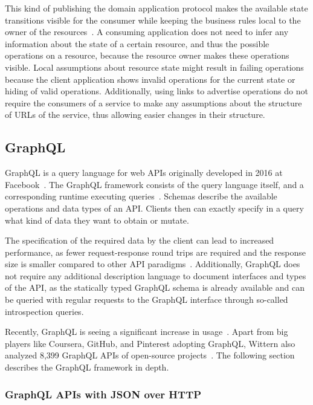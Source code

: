 This kind of publishing the domain application protocol makes the available state transitions visible for the consumer while keeping the business rules local to the owner of the resources~\cite{Webber2010}.
A consuming application does not need to infer any information about the state of a certain resource, and thus the possible operations on a resource, because the resource owner makes these operations visible.
Local assumptions about resource state might result in failing operations because the client application shows invalid operations for the current state or hiding of valid operations.
Additionally, using links to advertise operations do not require the consumers of a service to make any assumptions about the structure of \acp{URL} of the service, thus allowing easier changes in their structure.

\subsection{GraphQL}\label{sec:graphql}

GraphQL is a query language for web \acp{API} originally developed in 2016 at Facebook~\cite{Hartig2017}.
The GraphQL framework consists of the query language itself, and a corresponding runtime executing queries~\cite{Wittern2019}.
Schemas describe the available operations and data types of an \ac{API}.
Clients then can exactly specify in a query what kind of data they want to obtain or mutate.

The specification of the required data by the client can lead to increased performance, as fewer request-response round trips are required and the response size is smaller compared to other \ac{API} paradigms~\cite{Wittern2019}.
Additionally, GraphQL does not require any additional description language to document interfaces and types of the \ac{API}, as the statically typed GraphQL schema is already available and can be queried with regular requests to the GraphQL interface through so-called introspection queries.

Recently, GraphQL is seeing a significant increase in usage~\cite{Hartig2017}.
Apart from big players like Coursera, GitHub, and Pinterest adopting GraphQL, Wittern also analyzed 8,399 GraphQL \acp{API} of open-source projects~\cite{Wittern2019}.
The following section describes the GraphQL framework in depth.

\subsubsection{GraphQL \acsp{API} with \acs{JSON} over \acs{HTTP}}\label{sec:graphql-http}

